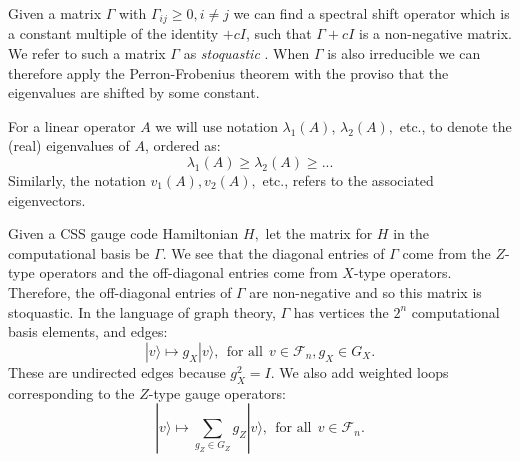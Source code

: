 \documentclass[11pt,oneside]{article}
\def\Complex{\mathbb{C}}
\def\Ham{H}
\def\Pauli{\mathcal{P}}
\newcommand{\ket}[1]{|{#1}\rangle}
\def\smbox#1{\ \ \mbox{#1}\ \ }
\newcommand{\Field}{\mathcal{F}}
\def\Fn{\Field^n}
\def\Fnd{\Field_{n}}
\begin{document}
Given a matrix $\Gamma$ with $\Gamma_{ij}\ge 0, i\ne j$ we can
find a spectral shift operator which is a constant multiple of the identity $+cI$,
such that $\Gamma+cI$ is a non-negative matrix. 
We refer to such a matrix $\Gamma$ as \emph{stoquastic} \cite{Bravyi2008,Bravyi2015}.
When $\Gamma$ is also irreducible we can therefore apply the Perron-Frobenius
theorem with the proviso that the eigenvalues are shifted by some constant.

For a linear operator $A$ we will use notation 
$\lambda_1(A)$, $\lambda_2(A),$ etc., to denote the (real) eigenvalues of $A$,
ordered as:
$$
    \lambda_1(A) \ge \lambda_2(A) \ge ...
$$
Similarly, the notation $v_1(A), v_2(A),$ etc., refers to the associated eigenvectors.



Given a CSS gauge code Hamiltonian $H,$ 
let the matrix for $H$ in the computational basis be $\Gamma.$
We see that the diagonal entries of $\Gamma$
come from the $Z$-type operators and the off-diagonal entries 
come from $X$-type operators.
Therefore, the off-diagonal entries of $\Gamma$ are non-negative 
and so this matrix is stoquastic.
In the language of graph theory,
$\Gamma$ has vertices the $2^n$ computational
basis elements, and edges:
$$
    \ket{v} \mapsto g_X \ket{v}, \smbox{for all} v\in\Fnd, g_X\in G_X.
$$
These are undirected edges because $g_X^2 = I.$
We also add weighted loops corresponding to the $Z$-type gauge operators:
$$
    \ket{v} \mapsto \sum_{g_Z\in G_Z} g_Z \ket{v}, \smbox{for all} v\in\Fnd.
$$
\end{document}
